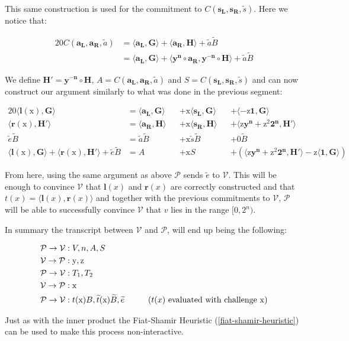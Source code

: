 \documentclass{article}
\newcommand{\eq}[1]{\begin{alignat*}{20}#1\end{alignat*}}
\renewcommand{\vec}[1]{\boldsymbol{#1}}
\newcommand{\ran}[1]{\mathrm{#1}}
\newcommand{\vecran}[1]{\mathbf{#1}}
\newcommand{\V}{\mathcal{V}}
\renewcommand{\P}{\mathcal{P}}
\newcommand{\tB}{\widetilde{B}}
\renewcommand{\tt}{\widetilde{t}}
\newcommand{\dotp}[2]{\langle #1, #2 \rangle}
\newcommand{\opn}[1]{\operatorname{#1}}
\newcommand{\vecl}[1]{\vec{#1_{\opn{L}}}}
\newcommand{\vecr}[1]{\vec{#1_{\opn{R}}}}
\begin{document}
This same construction is used for the commitment to $C(\vecl{s},
\vecr{s}, \widetilde{s})$. Here we notice that:

\eq{
	C(\vecl{a}, \vecr{a}, \widetilde{a}) &= \dotp{\vecl{a}}{\vec{G}} + \dotp{\vecr{a}}{\vec{H}} + \widetilde{a}\tB \\
	&= \dotp{\vecl{a}}{\vec{G}} + \dotp{\vecran{y^n}\circ \vecr{a}}{\vecran{y^{-n}}\circ \vec{H}} + \widetilde{a}\tB
}

We define $\vec{H'} = \vecran{y^{-n}}\circ\vec{H}$, $A = C(\vecl{a},\vecr{a}, \widetilde{a})$ and $S = C(\vecl{s}, \vecr{s}, \widetilde{s})$ and can now construct our argument similarly to what was done in the previous segment:

\eq{
	\dotp{\vec{l}(\ran{x})}{\vec{G}} &= \dotp{\vecl{a}}{\vec{G}} &&+ \ran{x}\dotp{\vecl{s}}{\vec{G}} &&+ \dotp{-\ran{z}\vec{1}}{\vec{G}} \\
	\dotp{\vec{r}(\ran{x})}{\vec{H'}} &= \dotp{\vecr{a}}{\vec{H}} &&+ \ran{x}\dotp{\vecr{s}}{\vec{H}} &&+ \dotp{\ran{z}\vecran{y^n} + \ran{z^2}\vec{2^n}}{\vec{H'}}\\
	\widetilde{e}\tB &= \widetilde{a}\tB &&+ \ran{x}\widetilde{s}\tB &&+ 0 \tB \\
	\dotp{\vec{l}(\ran{x})}{\vec{G}} + \dotp{\vec{r}(\ran{x})}{\vec{H'}} + \widetilde{e}\tB &= A &&+ \ran{x}S &&+ (\dotp{\ran{z}\vecran{y^n} + \ran{z^2}\vec{2^n}}{\vec{H'}} - \ran{z}\dotp{\vec{1}}{\vec{G}})
}

From here, using the same argument as above $\P$ sends $\widetilde{e}$ to $\V$. This will be enough to convince $\V$ that $\vec{l}(x)$ and $\vec{r}(x)$ are correctly constructed and that $t(x) = \dotp{\vec{l}(x)}{\vec{r}(x)}$ and together with the previous commitments to $\V$, $\P$ will be able to successfully convince $\V$ that $v$ lies in the range $[0, 2^n)$.

In summary the transcript between $\V$ and $\P$, will end up being the following:

\eq{
	\P \rightarrow \V &: V, n, A, S \\
	\V \rightarrow \P &: \ran{y}, \ran{z} \\
	\P \rightarrow \V &: T_1, T_2 \\
	\V \rightarrow \P &: \ran{x} \\
	\P \rightarrow \V &: t(\ran{x})B, \tt(\ran{x})\tB, \widetilde{e} \hspace*{1cm}\text{($t(x)$ evaluated with challenge $\ran{x}$)}\\
}

Just as with the inner product the Fiat-Shamir Heuristic (\ref{fiat-shamir-heuristic}) can be used to make this process non-interactive.
\end{document}
